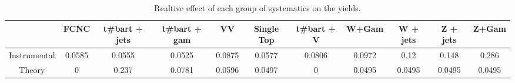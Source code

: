 \begin{table}[htbp]
\begin{center}
\begin{tabular}{|c|c|c|c|c|c|c|c|c|c|c|}
\hline 
      & FCNC      & t#bar{t} + jets      & t#bar{t} +  gam      & VV      & Single Top      & t#bar{t} + V      & W+Gam      & W + jets      & Z + jets      & Z+Gam \\ 
\hline 
 Instrumental & 0.0585 & 0.0555 & 0.0525 & 0.0875 & 0.0577 & 0.0806 & 0.0972 & 0.12 & 0.148 & 0.286 \\ 
 Theory & 0 & 0.237 & 0.0781 & 0.0596 & 0.0497 & 0 & 0.0495 & 0.0495 & 0.0495 & 0.0495 \\ 
\hline 
\end{tabular} 
\caption{Realtive effect of each group of systematics on the yields.} 
\end{center} 
\end{table} 
